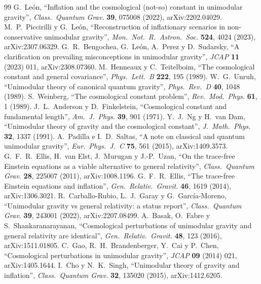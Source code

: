 \begin{thebibliography}{99}
\small
{} G.~León, ``Inflation and the cosmological (not-so) constant in unimodular gravity'', \emph{Class.\ Quantum Grav.} \textbf{39}, 075008 (2022), arXiv:2202.04029.
 M.~P.~Piccirilli y G.~León, ``Reconstruction of inflationary scenarios in non-conservative unimodular gravity'', \emph{Mon.\ Not.\ R.\ Astron.\ Soc.} \textbf{524}, 4024 (2023), arXiv:2307.06329.
 G.~R.~Bengochea, G.~León, A.~Perez y D.~Sudarsky, ``A clarification on prevailing misconceptions in unimodular gravity'', \emph{JCAP} \textbf{11} (2023) 011, arXiv:2308.07360.
 M.~Henneaux y C.~Teitelboim, ``The cosmological constant and general covariance'', \emph{Phys.\ Lett.\ B} \textbf{222}, 195 (1989).
 W.~G.~Unruh, ``Unimodular theory of canonical quantum gravity'', \emph{Phys.\ Rev.\ D} \textbf{40}, 1048 (1989).
 S.~Weinberg, ``The cosmological constant problem'', \emph{Rev.\ Mod.\ Phys.} \textbf{61}, 1 (1989).
 J.~L.~Anderson y D.~Finkelstein, ``Cosmological constant and fundamental length'', \emph{Am.\ J.\ Phys.} \textbf{39}, 901 (1971).
 Y.~J.~Ng y H.~van Dam, ``Unimodular theory of gravity and the cosmological constant'', \emph{J.\ Math.\ Phys.} \textbf{32}, 1337 (1991).
 A.~Padilla e I.~D.~Saltas, ``A note on classical and quantum unimodular gravity'', \emph{Eur.\ Phys.\ J.\ C} \textbf{75}, 561 (2015), arXiv:1409.3573.
 G.~F.~R.~Ellis, H.~van Elst, J.~Murugan y J.-P.~Uzan, ``On the trace-free Einstein equations as a viable alternative to general relativity'', \emph{Class.\ Quantum Grav.} \textbf{28}, 225007 (2011), arXiv:1008.1196.
 G.~F.~R.~Ellis, ``The trace-free Einstein equations and inflation'', \emph{Gen.\ Relativ.\ Gravit.} \textbf{46}, 1619 (2014), arXiv:1306.3021.
 R.~Carballo-Rubio, L.~J.~Garay y G.~García-Moreno, ``Unimodular gravity vs general relativity: a status report'', \emph{Class.\ Quantum Grav.} \textbf{39}, 243001 (2022), arXiv:2207.08499.
 A.~Basak, O.~Fabre y S.~Shankaranarayanan, ``Cosmological perturbations of unimodular gravity and general relativity are identical'', \emph{Gen.\ Relativ.\ Gravit.} \textbf{48}, 123 (2016), arXiv:1511.01805.
 C.~Gao, R.~H.~Brandenberger, Y.~Cai y P.~Chen, ``Cosmological perturbations in unimodular gravity'', \emph{JCAP} \textbf{09} (2014) 021, arXiv:1405.1644.
 I.~Cho y N.~K.~Singh, ``Unimodular theory of gravity and inflation'', \emph{Class.\ Quantum Grav.} \textbf{32}, 135020 (2015), arXiv:1412.6205.

\end{thebibliography}
